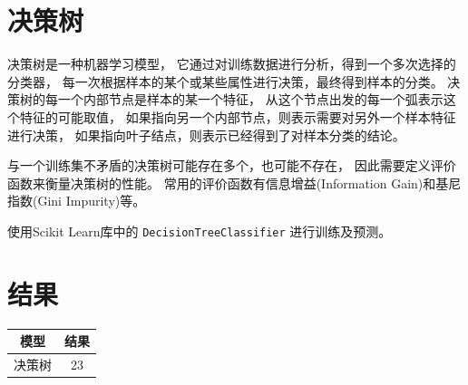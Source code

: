 \documentclass[a4paper]{article}
\begin{document}
\section{决策树}

决策树是一种机器学习模型，
它通过对训练数据进行分析，得到一个多次选择的分类器，
每一次根据样本的某个或某些属性进行决策，最终得到样本的分类。
决策树的每一个内部节点是样本的某一个特征，
从这个节点出发的每一个弧表示这个特征的可能取值，
如果指向另一个内部节点，则表示需要对另外一个样本特征进行决策，
如果指向叶子结点，则表示已经得到了对样本分类的结论。

与一个训练集不矛盾的决策树可能存在多个，也可能不存在，
因此需要定义评价函数来衡量决策树的性能。
常用的评价函数有信息增益(Information Gain)和基尼指数(Gini Impurity)等。

使用Scikit Learn库中的 \lstinline[basicstyle=\ttfamily]|DecisionTreeClassifier|
进行训练及预测。

\section{结果}

\begin{table}[h]
    \centering
    \begin{tabular}{cc}
        \hline
        模型 & 结果 \\
        \hline
        决策树 & 23 \\
        \hline
    \end{tabular}
\end{table}

{}

\end{document}
